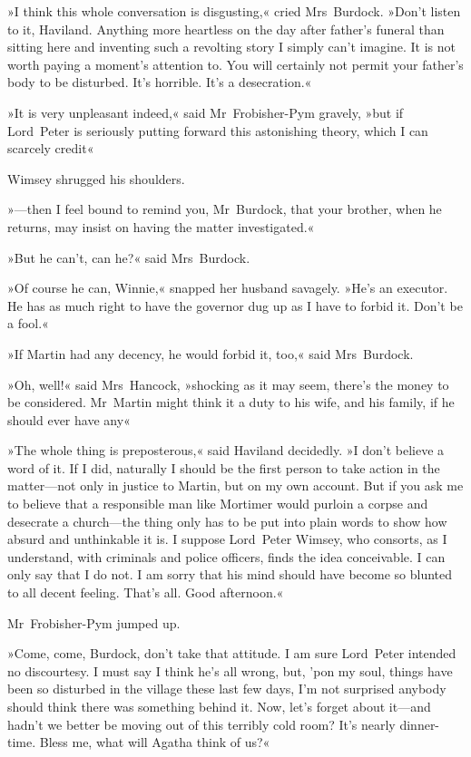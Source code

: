 »I think this whole conversation is disgusting,« cried Mrs~Burdock. »Don't listen to it, Haviland. Anything more heartless on the day after father's funeral than sitting here and inventing such a revolting story I simply can't imagine. It is not worth paying a moment's attention to. You will certainly not permit your father's body to be disturbed. It's horrible. It's a desecration.«

»It is very unpleasant indeed,« said Mr~Frobisher-Pym gravely, »but if Lord~Peter is seriously putting forward this astonishing theory, which I can scarcely credit\longdash«

Wimsey shrugged his shoulders.

»—then I feel bound to remind you, Mr~Burdock, that your brother, when he returns, may insist on having the matter investigated.«

»But he can't, can he?« said Mrs~Burdock.

»Of course he can, Winnie,« snapped her husband savagely. »He's an executor. He has as much right to have the governor dug up as I have to forbid it. Don't be a fool.«

»If Martin had any decency, he would forbid it, too,« said Mrs~Burdock.

»Oh, well!« said Mrs~Hancock, »shocking as it may seem, there's the money to be considered. Mr~Martin might think it a duty to his wife, and his family, if he should ever have any\longdash«

»The whole thing is preposterous,« said Haviland decidedly. »I don't believe a word of it. If I did, naturally I should be the first person to take action in the matter—not only in justice to Martin, but on my own account. But if you ask me to believe that a responsible man like Mortimer would purloin a corpse and desecrate a church—the thing only has to be put into plain words to show how absurd and unthinkable it is. I suppose Lord~Peter Wimsey, who consorts, as I understand, with criminals and police officers, finds the idea conceivable. I can only say that I do not. I am sorry that his mind should have become so blunted to all decent feeling. That's all. Good afternoon.«

Mr~Frobisher-Pym jumped up.

»Come, come, Burdock, don't take that attitude. I am sure Lord~Peter intended no discourtesy. I must say I think he's all wrong, but, 'pon my soul, things have been so disturbed in the village these last few days, I'm not surprised anybody should think there was something behind it. Now, let's forget about it—and hadn't we better be moving out of this terribly cold room? It's nearly dinner-time. Bless me, what will Agatha think of us?«

